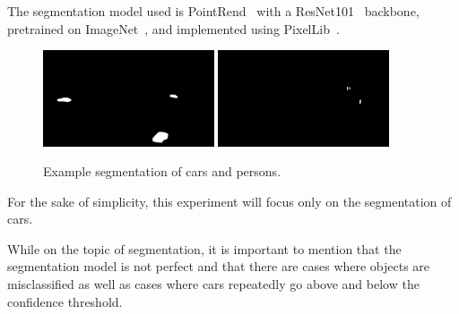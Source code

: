 \par
The segmentation model used is PointRend~\cite{pointrend} with a ResNet101~\cite{resnet} backbone, pretrained on ImageNet~\cite{imagenet}, and implemented using PixelLib~\cite{pixellib}.
\begin{figure}[H]
    \centering
    \includegraphics[width=0.45\textwidth]{resources/methodology/car_segmentation.png}
    \includegraphics[width=0.45\textwidth]{resources/methodology/person_segmentation.png}
    \caption[Example Segmentation of Cars and Persons]{Example segmentation of cars and persons.}
    \label{fig:seg_car_person}
\end{figure}
For the sake of simplicity, this experiment will focus only on the segmentation of cars.
\par
While on the topic of segmentation, it is important to mention that the segmentation model is not perfect and that there are cases where objects are misclassified as well as cases where cars repeatedly go above and below the confidence threshold.
